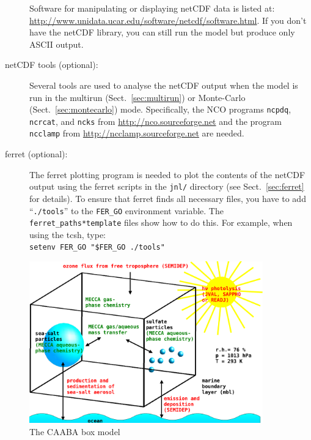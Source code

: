 \documentclass[twoside]{article}
\begin{document}
\begin{description}
  Software for manipulating or displaying netCDF data is listed at:
  \url{http://www.unidata.ucar.edu/software/netcdf/software.html}. If
  you don't have the netCDF library, you can still run the model but
  produce only ASCII output.
\item[netCDF tools (optional):] Several tools are used to analyse the
  netCDF output when the model is run in the multirun
  (Sect.~\ref{sec:multirun}) or Monte-Carlo (Sect.~\ref{sec:montecarlo})
  mode. Specifically, the NCO programs \verb|ncpdq|, \verb|ncrcat|, and
  \verb|ncks| from \url{http://nco.sourceforge.net} and the program
  \verb|ncclamp| from \url{http://ncclamp.sourceforge.net} are needed.
\item[ferret (optional):] The ferret plotting program is needed to plot
  the contents of the netCDF output using the ferret scripts in the
  \verb|jnl/| directory (see Sect.~\ref{sec:ferret} for details). To
  ensure that ferret finds all necessary files, you have to add
  ``\verb|./tools|'' to the \verb|FER_GO| environment variable. The
  \verb|ferret_paths*template| files show how to do this. For example,
  when using the tcsh, type:\\
  \verb|setenv FER_GO "$FER_GO ./tools"|
\end{description}

\begin{figure}%
  \begin{center}
  \includegraphics[width=0.9\textwidth]{caaba_sketch}
  \end{center}
  \caption{The CAABA box model}
  \label{fig:caaba_sketch}
\end{figure}
\end{document}

